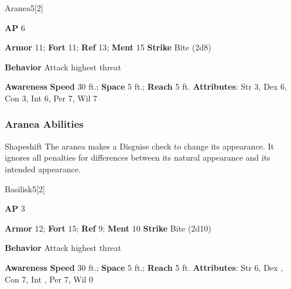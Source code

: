 \begin{monsection}{Aranea}{5}[2]
\vspace{-1em}\vspace{-1em}
\begin{spellcontent}
\begin{spelltargetinginfo}
{\textbf{AP} 6}

\pari \textbf{Armor} 11;
\textbf{Fort} 11;
\textbf{Ref} 13;
\textbf{Ment} 15
\pari \textbf{Strike} Bite  (2d8)



\pari \textbf{Behavior} Attack highest threat
\end{spelltargetinginfo}
\end{spellcontent}

\begin{monsterfooter}
\pari \textbf{Awareness} 
\pari \textbf{Speed} 30 ft.;
\textbf{Space} 5 ft.;
\textbf{Reach} 5 ft.
\pari \textbf{Attributes}:
Str 3,
Dex 6,
Con 3,
Int 6,
Per 7,
Wil 7
\end{monsterfooter}
\end{monsection}


\subsubsection{Aranea Abilities}

\begin{freeability}{Shapeshift}
The aranea makes a Disguise check to change its appearance.
It ignores all penalties for differences between its natural appearance and its intended appearance.
\end{freeability}

\begin{monsection}{Basilisk}{5}[2]
\vspace{-1em}\vspace{-1em}
\begin{spellcontent}
\begin{spelltargetinginfo}
{\textbf{AP} 3}

\pari \textbf{Armor} 12;
\textbf{Fort} 15;
\textbf{Ref} 9;
\textbf{Ment} 10
\pari \textbf{Strike} Bite  (2d10)



\pari \textbf{Behavior} Attack highest threat
\end{spelltargetinginfo}
\end{spellcontent}

\begin{monsterfooter}
\pari \textbf{Awareness} 
\pari \textbf{Speed} 30 ft.;
\textbf{Space} 5 ft.;
\textbf{Reach} 5 ft.
\pari \textbf{Attributes}:
Str 6,
Dex ,
Con 7,
Int ,
Per 7,
Wil 0
\end{monsterfooter}
\end{monsection}


